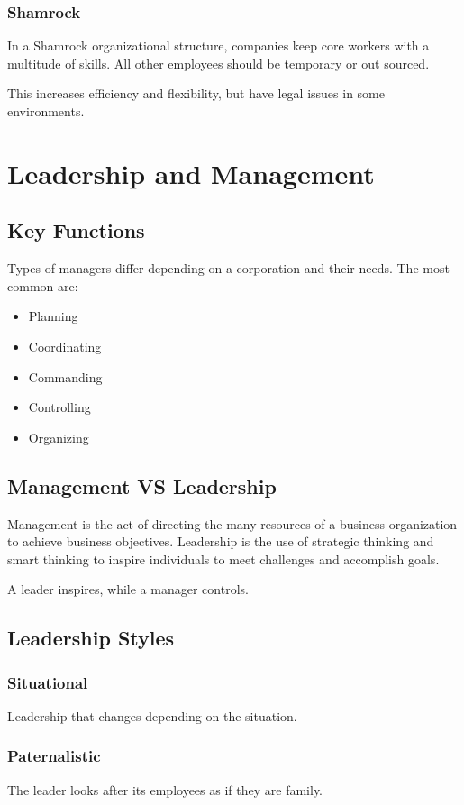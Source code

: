\documentclass{report}
\begin{document}
\subsection{Shamrock}
In a Shamrock organizational structure, companies keep core workers with a multitude of skills.
All other employees should be temporary or out sourced.

This increases efficiency and flexibility, but have legal issues in some environments.

\chapter{Leadership and Management} 
\section{Key Functions}
Types of managers differ depending on a corporation and their needs.
The most common are:
\begin{itemize}
	\item Planning
	\item Coordinating
	\item Commanding
	\item Controlling
	\item Organizing
\end{itemize}

\section{Management VS Leadership}
Management is the act of directing the many resources of a business organization to achieve business objectives.
Leadership is the use of strategic thinking and smart thinking to inspire individuals to meet challenges and accomplish goals.

A leader inspires, while a manager controls.

\section{Leadership Styles}
\subsection{Situational}
Leadership that changes depending on the situation.

\subsection{Paternalistic}
The leader looks after its employees as if they are family.
\end{document}

